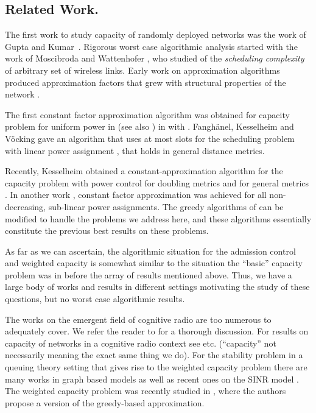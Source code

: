 \documentclass[11pt]{amsart}
\begin{document}
\subsection*{Related Work.}

The first work to study capacity of randomly deployed networks was the work of Gupta and Kumar~\cite{kumar00}. 
Rigorous worst case algorithmic analysis started with
the  work of Moscibroda and Wattenhofer \cite{MoWa06}, who
studied of the \emph{scheduling complexity} of arbitrary set
of wireless links. 
Early work on approximation algorithms
 produced approximation
factors that grew with structural properties of the network \cite{moscibroda06b,MoscibrodaOW07,chafekar07}.


The first constant factor approximation algorithm was obtained for
capacity problem for uniform power in \cite{GHWW09} (see also
\cite{HW09}) in  with .
Fangh\"anel, Kesselheim and V\"ocking \cite{FKV09} gave an algorithm
that uses at most  slots for the scheduling problem
with linear power assignment ,
that holds in general distance metrics.

Recently, Kesselheim obtained 
a constant-approximation algorithm
for the capacity problem with power control for doubling metrics
and  for general metrics \cite{KesselheimSoda11}. In another work \cite{SODA11}, constant
factor approximation was achieved for all non-decreasing, sub-linear power assignments.
The greedy algorithms of \cite{GHWW09,HW09,SODA11} can be modified to handle the problems
we address here, and these algorithms essentially constitute the previous best results on these 
problems.

As far as we can ascertain, the algorithmic situation for the admission control and weighted capacity
is somewhat similar to the situation the ``basic'' capacity problem was in before the array of results
mentioned above. Thus, we have a large body of works and results in different settings motivating
the study of these questions, but no worst case algorithmic results.

The  works on the emergent field of cognitive radio are too numerous to adequately cover. We refer the reader to  \cite{Bahl:2009:WSN:1592568.1592573} for a  thorough discussion. For results on capacity of networks
in a cognitive radio context see \cite{jafarjournal,shiicccn} etc. (``capacity'' not necessarily meaning the exact same thing we do). For the stability problem in a queuing theory setting
that gives rise to the weighted capacity problem there are many works in graph based models \cite{DBLP:conf/infocom/SharmaMS06,bestInfocom08,DBLP:conf/mobihoc/LiBX09} as well as recent
ones on the SINR model \cite{lqfmobihoc}.  The weighted capacity problem was recently studied in \cite{wanwireless}, where the authors propose a version of the greedy-based  approximation. 
\end{document}
